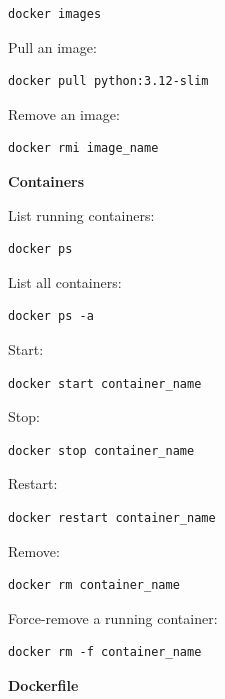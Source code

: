 \documentclass[11pt,letterpaper]{article}
\begin{document}
\begin{lstlisting}
docker images
\end{lstlisting}

Pull an image:

\begin{lstlisting}
docker pull python:3.12-slim
\end{lstlisting}

Remove an image:

\begin{lstlisting}
docker rmi image_name
\end{lstlisting}

\textbf{Containers}

List running containers:

\begin{lstlisting}
docker ps
\end{lstlisting}

List all containers:

\begin{lstlisting}
docker ps -a
\end{lstlisting}

Start:

\begin{lstlisting}
docker start container_name
\end{lstlisting}

Stop:

\begin{lstlisting}
docker stop container_name
\end{lstlisting}

Restart:

\begin{lstlisting}
docker restart container_name
\end{lstlisting}

Remove:

\begin{lstlisting}
docker rm container_name
\end{lstlisting}

Force-remove a running container:

\begin{lstlisting}
docker rm -f container_name
\end{lstlisting}



\textbf{Dockerfile}
\end{document}
